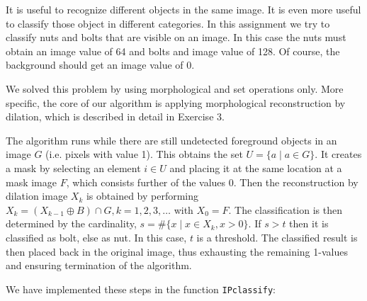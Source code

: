It is useful to recognize different objects in the same image. It is even more useful to classify those object in different categories.
In this assignment we try to classify nuts and bolts that are visible on an image.
In this case the nuts must obtain an image value of 64 and bolts and image value of 128.
Of course, the background should get an image value of 0.

We solved this problem by using morphological and set operations only.
More specific, the core of our algorithm is applying morphological reconstruction by dilation, which is described in detail in Exercise 3.

The algorithm runs while there are still undetected foreground objects in an image \(G\) (i.e. pixels with value 1).
This obtains the set \(U = \{a \mid a \in G\}\).
It creates a mask by selecting an element \(i \in U\) and placing it at the same location at a mask image \(F\), which consists further of the values 0.
Then the reconstruction by dilation image \(X_k\) is obtained by performing \(X_k = (X_{k-1} \oplus B) \cap G, k = 1, 2, 3, \ldots\) with \(X_0 = F\).
The classification is then determined by the cardinality, \(s = \#\{x \mid x \in X_k, x > 0\}\).
If \(s > t\) then it is classified as bolt, else as nut.
In this case, \(t\) is a threshold.
The classified result is then placed back in the original image, thus exhausting the remaining 1-values and ensuring termination of the algorithm.

We have implemented these steps in the function \texttt{IPclassify}: 

